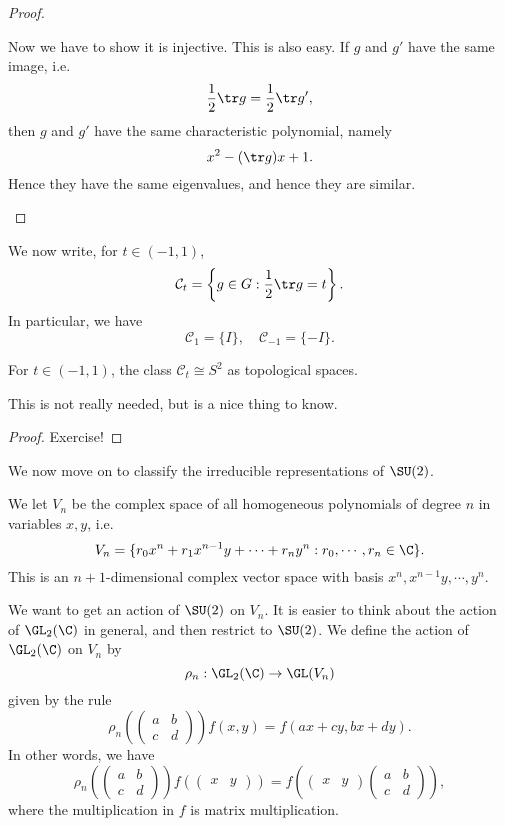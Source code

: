 \documentclass[a4paper]{article}
\begin{document}
\begin{proof}
\begin{enumerate}
      Now we have to show it is injective. This is also easy. If $g$ and $g'$ have the same image, i.e.
      \[
        \frac{1}{2} \tr g = \frac{1}{2} \tr g',
      \]
      then $g$ and $g'$ have the same characteristic polynomial, namely
      \[
        x^2 - (\tr g)x + 1.
      \]
      Hence they have the same eigenvalues, and hence they are similar.
  \end{enumerate}
\end{proof}

We now write, for $t \in (-1, 1)$,
\[
  \mathcal{C}_t = \left\{g \in G: \frac{1}{2} \tr g = t\right\}.
\]
In particular, we have
\[
  \mathcal{C}_1 = \{I\}, \quad \mathcal{C}_{-1} = \{-I\}.
\]
\begin{prop}
  For $t \in (-1, 1)$, the class $\mathcal{C}_t \cong S^2$ as topological spaces.
\end{prop}
This is not really needed, but is a nice thing to know.
\begin{proof}
  Exercise! %
\end{proof}

We now move on to classify the irreducible representations of $\SU(2)$.

We let $V_n$ be the complex space of all homogeneous polynomials of degree $n$ in variables $x, y$, i.e.
\[
  V_n = \{r_0 x^n + r_1 x^{n - 1}y + \cdots + r_n y^n: r_0, \cdots, r_n \in \C\}.
\]
This is an $n + 1$-dimensional complex vector space with basis $x^n, x^{n - 1}y, \cdots, y^n$.

We want to get an action of $\SU(2)$ on $V_n$. It is easier to think about the action of $\GL_2(\C)$ in general, and then restrict to $\SU(2)$. We define the action of $\GL_2(\C)$ on $V_n$ by
\[
  \rho_n: \GL_2(\C) \to \GL(V_n)
\]
given by the rule
\[
  \rho_n\left(
  \begin{pmatrix}
    a & b\\
    c & d
  \end{pmatrix}\right) f(x, y) = f(ax + cy, bx + dy).
\]
In other words, we have
\[
  \rho_n\left(
  \begin{pmatrix}
    a & b\\
    c & d
  \end{pmatrix}\right) f\left(
  \begin{pmatrix}
    x & y
  \end{pmatrix}\right) = f\left(
  \begin{pmatrix}
    x & y
  \end{pmatrix}
  \begin{pmatrix}
    a & b\\
    c & d
  \end{pmatrix}\right),
\]
where the multiplication in $f$ is matrix multiplication.
\end{document}
